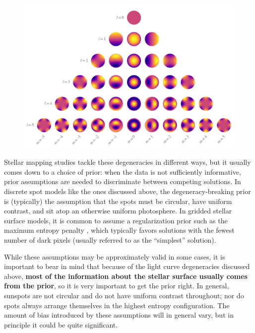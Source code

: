 \documentclass[modern]{aastex62}
\begin{document}
\begin{figure}[t!]
    \begin{centering}
        \includegraphics[width=\linewidth]{figures/ylms.pdf}
    \end{centering}
\end{figure}

Stellar mapping studies tackle these degeneracies in different ways, but
it usually comes down to a choice of prior: when the data is not
sufficiently informative, prior assumptions are needed to discriminate
between competing solutions. In discrete spot models like the ones
discussed above, the degeneracy-breaking prior is (typically) the assumption that the
spots must be circular, have uniform contrast, and sit atop an otherwise
uniform photosphere. In gridded stellar surface models, it is common to
assume a regularization prior such as the maximum entropy penalty
\citep[e.g.,][]{Vogt1987}, which typically favors solutions with the fewest
number of dark pixels (usually referred to as the ``simplest'' solution).

While these assumptions may be approximately valid in some cases, it is
important to bear in mind that because of the light curve degeneracies discussed above,
\textbf{most of the information about the stellar surface usually comes from the prior},
so it is very important to get the
prior right. In general, sunspots are not circular and do not have uniform
contrast throughout; nor do spots always arrange themselves in the highest
entropy configuration. The amount of bias introduced by these assumptions
will in general vary, but in principle it could be quite significant.
\end{document}
